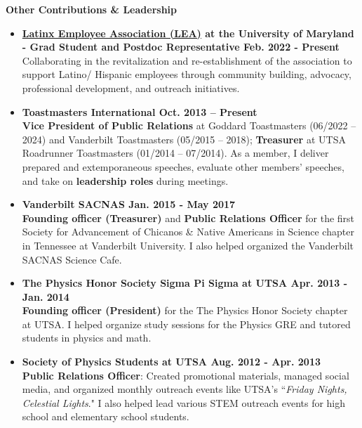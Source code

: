 \documentclass[12pt]{article}
\begin{document}
\noindent
\vspace{-3mm}
{\bf Other Contributions \& Leadership} \\
\vspace{-13mm}
\begin{center}
\end{center}
\vspace{-3mm}
\begin{itemize}
    \item \textbf{\href{https://umdlatino.wordpress.com/about/board-members/}{Latinx Employee Association (LEA)} at the University of Maryland - Grad Student and Postdoc Representative \hfill Feb. 2022 - Present} \\
    Collaborating in the revitalization and re-establishment of the association to support Latino/ Hispanic employees through community building, advocacy, professional development, and outreach initiatives.
    \item \textbf{Toastmasters International \hfill Oct. 2013 – Present} \\
    \textbf{Vice President of Public Relations} at Goddard Toastmasters (06/2022 – 2024) and Vanderbilt Toastmasters (05/2015 – 2018); \textbf{Treasurer} at UTSA Roadrunner Toastmasters (01/2014 – 07/2014). As a member, I deliver prepared and extemporaneous speeches, evaluate other members’ speeches, and take on \textbf{leadership roles} during meetings.
    \item \textbf{Vanderbilt SACNAS \hfill Jan. 2015 - May 2017} \\
    \textbf{Founding officer (Treasurer)} and \textbf{Public Relations Officer} for the first Society for Advancement of Chicanos \& Native Americans in Science chapter in Tennessee at Vanderbilt University. I also helped organized the Vanderbilt SACNAS Science Cafe.
    \item \textbf{The Physics Honor Society \text{\textbar} Sigma Pi Sigma at UTSA \hfill Apr. 2013 - Jan. 2014} \\
    \textbf{Founding officer (President)} for the The Physics Honor Society chapter at UTSA. I helped organize study sessions for the Physics GRE and tutored students in physics and math.
    \item \textbf{Society of Physics Students at UTSA \hfill Aug. 2012 - Apr. 2013} \\
    \textbf{Public Relations Officer}: Created promotional materials, managed social media, and organized monthly outreach events like UTSA’s “\textit{Friday Nights, Celestial Lights}." I also helped lead various STEM outreach events for high school and elementary school students.
\end{itemize}
\end{document}
